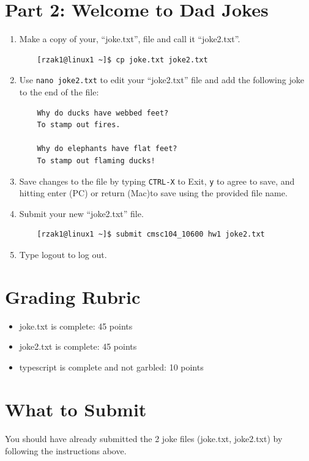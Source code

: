 \documentclass[letter,11pt]{article}
\begin{document}
\section*{Part 2: Welcome to Dad Jokes}
\begin{enumerate}
    \item Make a copy of your, ``joke.txt'', file and call it ``joke2.txt''.
    \begin{verbatim}
    [rzak1@linux1 ~]$ cp joke.txt joke2.txt
    \end{verbatim}
    \item Use \texttt{nano joke2.txt} to edit your ``joke2.txt'' file and add the following joke to the end of the file:
    \begin{verbatim}
    Why do ducks have webbed feet?
    To stamp out fires.

    Why do elephants have flat feet?
    To stamp out flaming ducks!
    \end{verbatim}
    \item Save changes to the file by typing \texttt{CTRL-X} to Exit, \texttt{y} to agree to save, and hitting enter (PC) or return (Mac)to save using the provided file name.
    \item Submit your new ``joke2.txt'' file.
    \begin{verbatim}
    [rzak1@linux1 ~]$ submit cmsc104_10600 hw1 joke2.txt
    \end{verbatim}
    \item Type logout to log out.
\end{enumerate}

\section*{Grading Rubric}
\begin{itemize}
    \item joke.txt is complete: 45 points
    \item joke2.txt is complete: 45 points
    \item typescript is complete and not garbled: 10 points
\end{itemize}

\section*{What to Submit}
\paragraph{}You should have already submitted the 2 joke files (joke.txt, joke2.txt) by following the instructions above.
\end{document}
